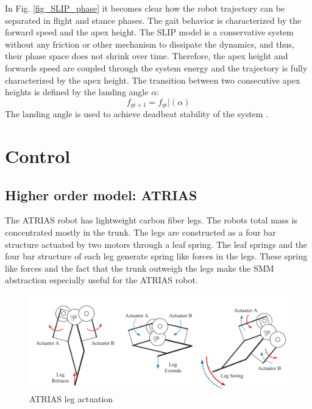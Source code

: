 \documentclass[10pt, conference]{IEEEtran}
\begin{document}
In Fig. \ref{fig_SLIP_phase} it becomes clear how the robot trajectory can be separated in flight and stance phases. The gait behavior is characterized by the forward speed and the apex height.
The SLIP model is a conservative system without any friction or other mechanism to dissipate the dynamics, and thus, their phase space does not shrink over time. 
Therefore, the apex height and forwards speed are coupled through the system energy and the trajectory is fully characterized by the apex height. 
The transition between two consecutive apex heights is defined by the landing angle \(\alpha\):
\begin{equation}
   {f}_{yi+1}={f}_{yi}|(\alpha)
\end{equation}
The landing angle is used to achieve deadbeat stability of the system \cite{Wu2014} \cite{Hutter2010}.




\section{Control}








\subsection{Higher order model: ATRIAS}

The ATRIAS robot has lightweight carbon fiber legs. The robots total mass is concentrated mostly in the trunk. The legs are constructed as a four bar structure actuated 
by two motors through a leaf spring. The leaf springs and the four bar structure of each leg generate spring like forces in the legs. These spring like forces and 
the fact that the trunk outweigh the legs make the SMM abstraction especially useful for the ATRIAS robot.

\begin{figure}[h]
   \centering
   \includegraphics[scale=0.07]{"assets/ATRIAS2.png"}
   \caption{ATRIAS leg actuation \cite{Grimes2012}}
   \label{fig_ATRIAS_motion}
\end{figure}
\end{document}
